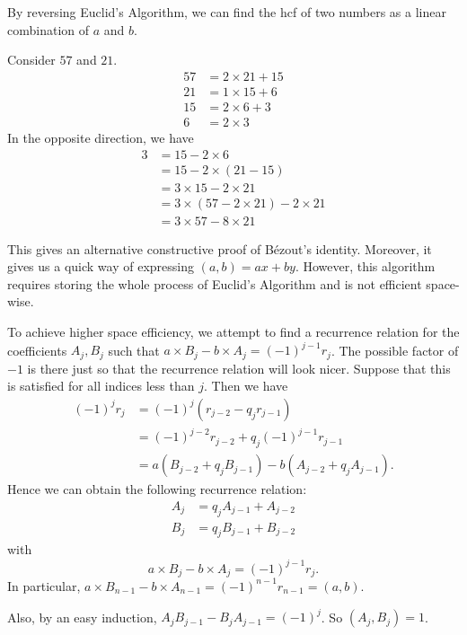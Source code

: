\documentclass[a4paper]{article}
\begin{document}
By reversing Euclid's Algorithm, we can find the hcf of two numbers as a linear combination of $a$ and $b$.
\begin{eg}
  Consider $57$ and $21$.
  \begin{align*}
    57 &= 2\times 21 + 15\\
    21 &= 1\times 15 + 6\\
    15 &= 2\times 6 + 3\\
    6 &= 2\times 3
  \end{align*}
  In the opposite direction, we have
  \begin{align*}
    3 &= 15 - 2\times 6\\
    &= 15 - 2\times (21 - 15)\\
    &= 3\times 15 - 2\times 21\\
    &= 3\times (57 - 2\times 21) - 2\times 21\\
    &= 3\times 57 - 8\times 21
  \end{align*}
\end{eg}

This gives an alternative constructive proof of B\'{e}zout's identity. Moreover, it gives us a quick way of expressing $(a, b) = ax + by$. However, this algorithm requires storing the whole process of Euclid's Algorithm and is not efficient space-wise.

To achieve higher space efficiency, we attempt to find a recurrence relation for the coefficients $A_j, B_j$ such that $a\times B_j - b \times A_j = (-1)^{j - 1}r_j$. The possible factor of $-1$ is there just so that the recurrence relation will look nicer. Suppose that this is satisfied for all indices less than $j$. Then we have
\begin{align*}
  (-1)^jr_{j} &= (-1)^j(r_{j - 2} - q_jr_{j - 1})\\
  &= (-1)^{j - 2} r_{j - 2} + q_j (-1)^{j - 1} r_{j - 1}\\
  &= a (B_{j - 2} + q_j B_{j - 1}) - b (A_{j - 2} + q_j A_{j - 1}).
\end{align*}
Hence we can obtain the following recurrence relation:
\begin{align*}
  A_j &= q_jA_{j-1} + A_{j-2}\\
  B_j &= q_jB_{j-1} + B_{j-2}
\end{align*}
with
\[
  a\times B_j - b\times A_j = (-1)^{j-1}r_j.
\]
In particular, $a\times B_{n-1} - b\times A_{n-1} = (-1)^{n-1}r_{n - 1} = (a, b)$.

Also, by an easy induction, $A_jB_{j - 1} - B_jA_{j-1} = (-1)^j$. So $(A_j, B_j) = 1$.
\end{document}
